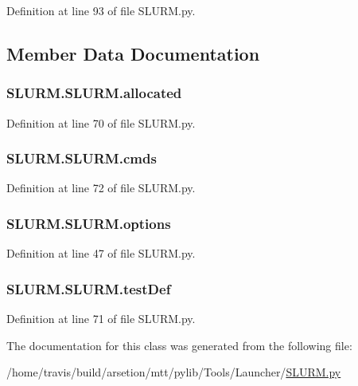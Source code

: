 Definition at line 93 of file S\-L\-U\-R\-M.\-py.



\subsection{Member Data Documentation}
\hypertarget{classSLURM_1_1SLURM_aee4130d6ff2007d08fad045aedd69781}{
\subsubsection[{allocated}]{\setlength{\rightskip}{0pt plus 5cm}S\-L\-U\-R\-M.\-S\-L\-U\-R\-M.\-allocated}}\label{classSLURM_1_1SLURM_aee4130d6ff2007d08fad045aedd69781}


Definition at line 70 of file S\-L\-U\-R\-M.\-py.

\hypertarget{classSLURM_1_1SLURM_ab755a940fd09c8fa416c177f692d31d6}{
\subsubsection[{cmds}]{\setlength{\rightskip}{0pt plus 5cm}S\-L\-U\-R\-M.\-S\-L\-U\-R\-M.\-cmds}}\label{classSLURM_1_1SLURM_ab755a940fd09c8fa416c177f692d31d6}


Definition at line 72 of file S\-L\-U\-R\-M.\-py.

\hypertarget{classSLURM_1_1SLURM_a652a43986b8bda5c6ddb866ab0513ac8}{
\subsubsection[{options}]{\setlength{\rightskip}{0pt plus 5cm}S\-L\-U\-R\-M.\-S\-L\-U\-R\-M.\-options}}\label{classSLURM_1_1SLURM_a652a43986b8bda5c6ddb866ab0513ac8}


Definition at line 47 of file S\-L\-U\-R\-M.\-py.

\hypertarget{classSLURM_1_1SLURM_a9b08ef79e039a8524f1fa6712b45182b}{
\subsubsection[{test\-Def}]{\setlength{\rightskip}{0pt plus 5cm}S\-L\-U\-R\-M.\-S\-L\-U\-R\-M.\-test\-Def}}\label{classSLURM_1_1SLURM_a9b08ef79e039a8524f1fa6712b45182b}


Definition at line 71 of file S\-L\-U\-R\-M.\-py.



The documentation for this class was generated from the following file\-:\begin{DoxyCompactItemize}
\item 
/home/travis/build/arsetion/mtt/pylib/\-Tools/\-Launcher/\hyperlink{SLURM_8py}{S\-L\-U\-R\-M.\-py}\end{DoxyCompactItemize}
